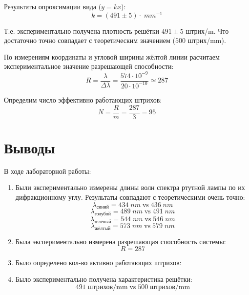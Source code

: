 \documentclass{article}
\begin{document}
Результаты опроксимации вида (\(y = kx\)):
\[ k = (491 \pm 5)\cdot \; mm^{-1} \]

Т.е. экспериментально получена плотность решётки \(491 \pm 5\) штрих/m. Что достаточно точно совпадает
с теоретическим значением (\(500\) штрих/mm).


По измерениям координаты и угловой ширины жёлтой линии расчитаем экспериментальное значение
разрешающей способности:
\[ R = \frac{\lambda}{\Delta\lambda} = \frac{574\cdot 10^{-9}}{20\cdot 10^{-10}} \simeq 287  \]

Определим число эффективно работающих штрихов:
\[ N = \frac{R}{m} = \frac{287}{3} = 95 \]

\section{Выводы}
В ходе лабораторной работы:
\begin{enumerate}
  \item Были экспериментально измерены длины волн спектра ртутной лампы по их дифракционному углу.
  Результаты совпадают с теоретическими очень точно:
  \[ \lambda_{\text{синий}} = 434\; nm \; \text{vs}\;  436\; nm \]
  \[ \lambda_{\text{голубой}} = 489\; nm\; \text{vs}\;  491\; nm \]
  \[ \lambda_{\text{зелёный}} = 544\; nm\; \text{vs}\;546\; nm \]
  \[ \lambda_{\text{жёлтый}} = 573\; nm\; \text{vs}\;579\; nm \]
  \item Была экспериментально измерена разрешающая способность системы:
  \[ R = 287 \]
  \item Было определено кол-во активно работающих штрихов:
  \item Было экспериментально получена характеристика решётки:
  \[ 491\; \text{штрихов/mm} \; \text{vs}\; 500\; \text{штрихов/mm}\]
\end{enumerate}
\end{document}
